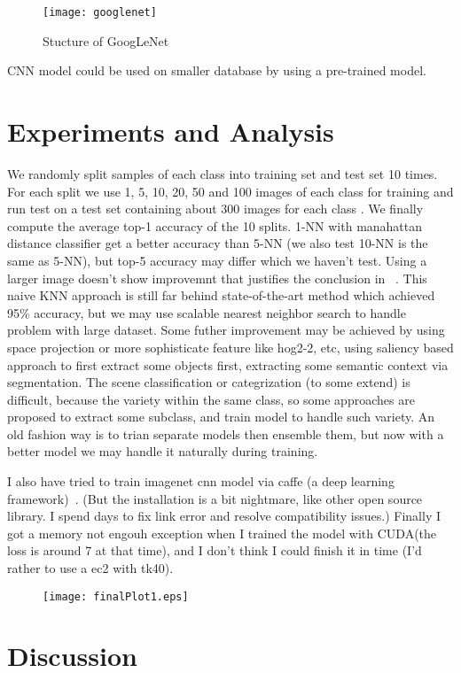 \documentclass[12pt]{article}
\begin{document}
\begin{figure}
\centering
\texttt{[image: googlenet]}
\caption{Stucture of GoogLeNet}
\end{figure}

CNN model could be used on smaller database by using a pre-trained model.
\section{Experiments and Analysis}
We randomly split samples of each class into training set and test set 10 times. For each split we use 1, 5, 10, 20, 50 and 100 images of each class for training and run test on a test set containing about 300 images for each class . We finally compute the average top-1 accuracy of the 10 splits. 1-NN with manahattan distance classifier get a better accuracy than 5-NN (we also test 10-NN is the same as 5-NN), but top-5 accuracy may differ which we haven't test. Using a larger image doesn't show improvemnt that justifies the conclusion in ~\citep{torralba200880}. This naive KNN approach is still far behind state-of-the-art method which achieved 95\% accuracy, but we may use scalable nearest neighbor search to handle problem with large dataset. Some futher improvement may be achieved by using space projection or more sophisticate feature like hog2-2, etc, using saliency based approach to first extract some objects first, extracting some semantic context via segmentation. The scene classification or categrization (to some extend) is difficult, because the variety within the same class, so some approaches are proposed to extract some subclass, and train model to handle such variety. An old fashion way is to trian separate models then ensemble them, but now with a better model we may handle it naturally during training. 

 I also have tried to train imagenet cnn model via caffe (a deep learning framework)~\citep{caffe}. (But the installation is a bit nightmare, like other open source library. I spend days to fix link error and resolve compatibility issues.) Finally I got a memory not engouh exception when I trained the model with CUDA(the loss is around 7 at that time), and I don't think I could finish it in time (I'd rather to use a ec2 with tk40).
\begin{figure}
\centering
\texttt{[image: finalPlot1.eps]}
\end{figure}
\section{Discussion}
\end{document}
